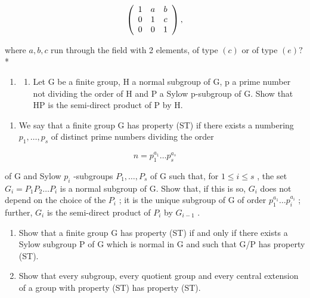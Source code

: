 \[
\left( \begin{array}{c c c} 1 & a & b \\ 0 & 1 & c \\ 0 & 0 & 1 \end{array} \right),
\]

where \(a, b, c\) run through the field with 2 elements, of type \((c)\) or of type \((e)?\) *

\begin{enumerate}
\def\labelenumi{\arabic{enumi}.}
\setcounter{enumi}{36}
\tightlist
\item
  \begin{enumerate}
  \def\labelenumii{(\alph{enumii})}
  \tightlist
  \item
    Let G be a finite group, H a normal subgroup of G, p a prime number not dividing the order of H and P a Sylow p-subgroup of G. Show that HP is the semi-direct product of P by H.
  \end{enumerate}
\end{enumerate}

\begin{enumerate}
\def\labelenumi{(\alph{enumi})}
\setcounter{enumi}{1}
\tightlist
\item
  We say that a finite group G has property (ST) if there exists a numbering \(p_{1}, \ldots, p_{s}\) of distinct prime numbers dividing the order
\end{enumerate}

\[
n = p _ {1} ^ {a _ {1}} \dots p _ {s} ^ {a _ {s}}
\]

of G and Sylow \(p_i\) -subgroups \(P_1, \ldots, P_s\) of G such that, for \(1 \leqslant i \leqslant s\) , the set \(G_i = P_1P_2 \ldots P_i\) is a normal subgroup of G. Show that, if this is so, \(G_i\) does not depend on the choice of the \(P_i\) ; it is the unique subgroup of G of order \(p_1^{a_1} \ldots p_i^{a_i}\) ; further, \(G_i\) is the semi-direct product of \(P_i\) by \(G_{i-1}\) .

\begin{enumerate}
\def\labelenumi{(\alph{enumi})}
\setcounter{enumi}{2}
\item
  Show that a finite group G has property (ST) if and only if there exists a Sylow subgroup P of G which is normal in G and such that G/P has property (ST).
\item
  Show that every subgroup, every quotient group and every central extension of a group with property (ST) has property (ST).
\end{enumerate}

